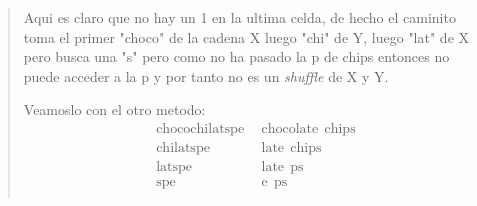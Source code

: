 \begin{quote}
    Aqui es claro que no hay un 1 en la ultima celda, de hecho el caminito toma el primer "choco" de la cadena X luego "chi" de Y, luego "lat" de X pero busca una "s" pero como no ha pasado la p de chips entonces no puede acceder a la p y por tanto no es un \textit{shuffle} de X y Y. \vspace{.2cm}

    Veamoslo con el otro metodo:
    \begin{align*}
        \text{chocochilatspe} &\ \ \text{chocolate} \ \ \text{chips} \\
        \text{chilatspe} &\ \ \text{late} \ \ \text{chips} \\
        \text{latspe} &\ \ \text{late} \ \ \text{ps} \\
        \text{spe} &\ \ \text{e} \ \ \text{ps} \\
    \end{align*}
    \vspace{-.6cm}
\end{quote}
